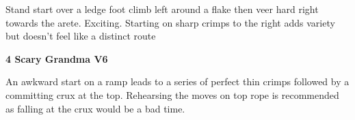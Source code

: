 \begin{multicols}{2}
			\begin{adjustwidth}{0.5cm}{}				
			Stand start over a ledge foot climb left around a flake then veer hard right towards the arete. Exciting. Starting on sharp crimps to the right adds variety but doesn't feel like a distinct route
			\end{adjustwidth}

			\label{rt:Scary Grandma}
\colorbox{RoyalBlue!20}{
\parbox{0.95\linewidth}{
\textbf{
4 Scary Grandma V6  \warn\warn
}
}
}

			\begin{adjustwidth}{0.5cm}{}				
			An awkward start on a ramp leads to a series of perfect thin crimps followed by a committing crux at the top. Rehearsing the moves on top rope is recommended as falling at the crux would be a bad time.
			\end{adjustwidth}
\end{multicols}
\clearpage